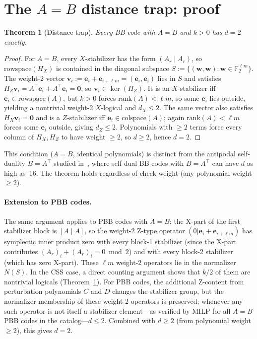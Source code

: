 \documentclass[aps,prxquantum,twocolumn,superscriptaddress,nofootinbib]{revtex4-2}
\newtheorem{theorem}{Theorem}
\newcommand{\FF}{\ensuremath{\mathbb{F}}}
\begin{document}
\section{The $A = B$ distance trap: proof}
\label{app:ab_trap}

\begin{theorem}[Distance trap]
\label{thm:ab_d2}
Every BB code with $A = B$ and $k > 0$ has $d = 2$ exactly.
\end{theorem}

\begin{proof}
For $A = B$, every $X$-stabilizer has the form $(A_r \mid A_r)$, so $\mathrm{rowspace}(H_X)$ is contained in the diagonal subspace $S := \{(\mathbf{w},\mathbf{w}) : \mathbf{w} \in \FF_2^{\ell m}\}$.
The weight-2 vector $\mathbf{v}_i := \mathbf{e}_i + \mathbf{e}_{i+\ell m} = (\mathbf{e}_i, \mathbf{e}_i)$ lies in $S$ and satisfies $H_Z \mathbf{v}_i = A^\top \mathbf{e}_i + A^\top \mathbf{e}_i = \mathbf{0}$, so $\mathbf{v}_i \in \ker(H_Z)$.
It is an $X$-stabilizer iff $\mathbf{e}_i \in \mathrm{rowspace}(A)$, but $k > 0$ forces $\mathrm{rank}(A) < \ell m$, so some $\mathbf{e}_i$ lies outside, yielding a nontrivial weight-2 $X$-logical and $d_X \leq 2$.
The same vector also satisfies $H_X \mathbf{v}_i = \mathbf{0}$ and is a $Z$-stabilizer iff $\mathbf{e}_i \in \mathrm{colspace}(A)$; again $\mathrm{rank}(A) < \ell m$ forces some $\mathbf{e}_i$ outside, giving $d_Z \leq 2$.
Polynomials with $\geq 2$ terms force every column of $H_X, H_Z$ to have weight $\geq 2$, so $d \geq 2$, hence $d = 2$.
\end{proof}

This condition ($A = B$, identical polynomials) is distinct from the antipodal self-duality $B = A^\top$ studied in~\cite{liang2025selfdual}, where self-dual BB codes with $B = A^\top$ can have $d$ as high as~16.
The theorem holds regardless of check weight (any polynomial weight $\geq 2$).

\paragraph{Extension to PBB codes.}
The same argument applies to PBB codes with $A = B$: the X-part of the first stabilizer block is $[A \mid A]$, so the weight-2 Z-type operator $(0|\mathbf{e}_i + \mathbf{e}_{i+\ell m})$ has symplectic inner product zero with every block-1 stabilizer (since the X-part contributes $(A_r)_i + (A_r)_i = 0 \bmod 2$) and with every block-2 stabilizer (which has zero X-part).
These $\ell m$ weight-2 operators lie in the normalizer $N(S)$.
In the CSS case, a direct counting argument shows that $k/2$ of them are nontrivial logicals (Theorem~\ref{thm:ab_d2}).
For PBB codes, the additional Z-content from perturbation polynomials $C$ and $D$ changes the stabilizer group, but the normalizer membership of these weight-2 operators is preserved; whenever any such operator is not itself a stabilizer element---as verified by MILP for all $A = B$ PBB codes in the catalog---$d \leq 2$.
Combined with $d \geq 2$ (from polynomial weight $\geq 2$), this gives $d = 2$.
\end{document}
